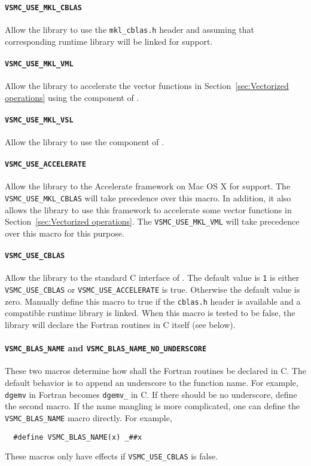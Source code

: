 \paragraph{\texttt{VSMC\_USE\_MKL\_CBLAS}} Allow the library to use the
\verb|mkl_cblas.h| header and assuming that corresponding runtime library will
be linked for \blas support.

\paragraph{\texttt{VSMC\_USE\_MKL\_VML}} Allow the library to accelerate the
vector functions in Section~\ref{sec:Vectorized operations} using the \vml
component of \mkl.

\paragraph{\texttt{VSMC\_USE\_MKL\_VSL}} Allow the library to use the \vsl
component of \mkl.

\paragraph{\texttt{VSMC\_USE\_ACCELERATE}} Allow the library to the Accelerate
framework on Mac OS X for \blas support. The \verb|VSMC_USE_MKL_CBLAS| will
take precedence over this macro. In addition, it also allows the library to use
this framework to accelerate some vector functions in
Section~\ref{sec:Vectorized operations}. The \verb|VSMC_USE_MKL_VML| will take
precedence over this macro for this purpose.

\paragraph{\texttt{VSMC\_USE\_CBLAS}} Allow the library to the standard C
interface of \blas. The default value is \verb|1| is either
\verb|VSMC_USE_CBLAS| or \verb|VSMC_USE_ACCELERATE| is true. Otherwise the
default value is zero. Manually define this macro to true if the \verb|cblas.h|
header is available and a compatible runtime library is linked. When this macro
is tested to be false, the library will declare the \blas Fortran routines in C
itself (see below).

\paragraph{\texttt{VSMC\_BLAS\_NAME} and
  \texttt{VSMC\_BLAS\_NAME\_NO\_UNDERSCORE}} These two macros determine how
shall the \blas Fortran routines be declared in C. The default behavior is to
append an underscore to the function name. For example, \verb|dgemv| in Fortran
becomes \verb|dgemv_| in C. If there should be no underscore, define the second
macro. If the name mangling is more complicated, one can define the
\verb|VSMC_BLAS_NAME| macro directly. For example,
\begin{Verbatim}
  #define VSMC_BLAS_NAME(x) _##x
\end{Verbatim}
These macros only have effects if \verb|VSMC_USE_CBLAS| is false.

